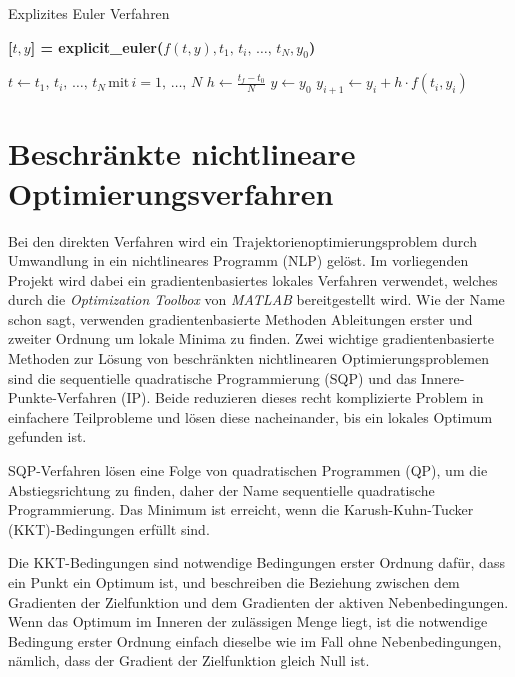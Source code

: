 \begin{algorithm}[H]
    \caption{Explizites Euler Verfahren}\label{algo:expl_euler}
    \textbf{[$t, y $] = explicit\_euler($ f(t, y), {t_1,\,t_i,\,\dots,\,t_N}, y_0$)}
    \begin{algorithmic}
        \vspace{.2em}
        \STATE $t \leftarrow {t_1,\,t_i,\,\dots,\,t_N}\,\text{mit}\,i = 1,\,\dots,\,N$
        \vspace{.2em}
        \STATE $h \leftarrow \frac{t_f-t_0}{N}$
        \vspace{.2em}
        \STATE $y \leftarrow y_0$
        \vspace{.2em}
            \STATE $y_{i+1} \leftarrow y_i + h \cdot f(t_i, y_i) $
        \ENDFOR
        \vspace{.8em}
    \end{algorithmic}
\end{algorithm}


\section{Beschränkte nichtlineare Optimierungsverfahren}
Bei den direkten Verfahren wird ein Trajektorienoptimierungsproblem durch Umwandlung in ein nichtlineares Programm (NLP) gelöst. Im vorliegenden Projekt wird dabei ein gradientenbasiertes lokales Verfahren verwendet, welches durch die \textit{Optimization Toolbox} von \textit{MATLAB} bereitgestellt wird. Wie der Name schon sagt, verwenden gradientenbasierte Methoden Ableitungen erster und zweiter Ordnung um lokale Minima zu finden. Zwei wichtige gradientenbasierte Methoden zur Lösung von beschränkten nichtlinearen Optimierungsproblemen sind die sequentielle quadratische Programmierung (SQP) und das Innere-Punkte-Verfahren (IP). Beide reduzieren dieses recht komplizierte Problem in einfachere Teilprobleme und lösen diese nacheinander, bis ein lokales Optimum gefunden ist.

SQP-Verfahren lösen eine Folge von quadratischen Programmen (QP), um die Abstiegsrichtung zu finden, daher der Name sequentielle quadratische Programmierung. Das Minimum ist erreicht, wenn die Karush-Kuhn-Tucker (KKT)-Bedingungen erfüllt sind.

Die KKT-Bedingungen sind notwendige Bedingungen erster Ordnung dafür, dass ein Punkt ein Optimum ist, und beschreiben die Beziehung zwischen dem Gradienten der Zielfunktion und dem Gradienten der aktiven Nebenbedingungen. Wenn das Optimum im Inneren der zulässigen Menge liegt, ist die notwendige Bedingung erster Ordnung einfach dieselbe wie im Fall ohne Nebenbedingungen, nämlich, dass der Gradient der Zielfunktion gleich Null ist.


